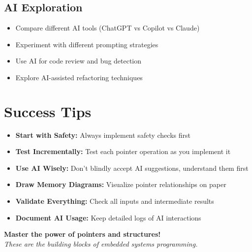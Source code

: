 \documentclass[11pt,a4paper]{article}
\begin{document}
\subsection{AI Exploration}
\begin{itemize}
    \item Compare different AI tools (ChatGPT vs Copilot vs Claude)
    \item Experiment with different prompting strategies
    \item Use AI for code review and bug detection
    \item Explore AI-assisted refactoring techniques
\end{itemize}

\section{Success Tips}

\begin{itemize}
    \item \textbf{Start with Safety:} Always implement safety checks first
    \item \textbf{Test Incrementally:} Test each pointer operation as you implement it
    \item \textbf{Use AI Wisely:} Don't blindly accept AI suggestions, understand them first
    \item \textbf{Draw Memory Diagrams:} Visualize pointer relationships on paper
    \item \textbf{Validate Everything:} Check all inputs and intermediate results
    \item \textbf{Document AI Usage:} Keep detailed logs of AI interactions
\end{itemize}

\vspace{1cm}

\begin{center}
\textbf{Master the power of pointers and structures!}\\
\textit{These are the building blocks of embedded systems programming.}
\end{center}
\end{document}
